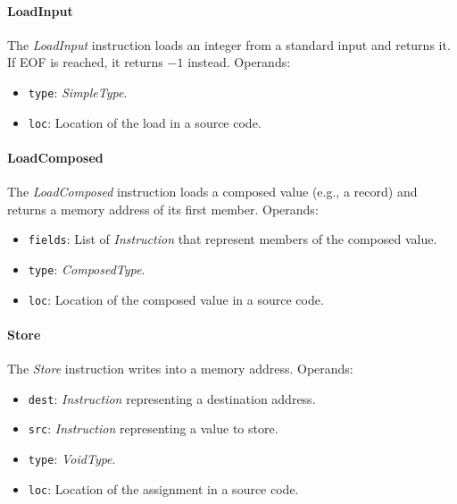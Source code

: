 \documentclass[thesis=M,english]{FITthesis}[2019/12/23]
\begin{document}
\paragraph*{LoadInput} The \emph{LoadInput} instruction loads an integer from a standard input and returns it. If EOF is reached, it returns $-1$ instead. Operands:
\begin{itemize}
    \item \texttt{type}: \emph{SimpleType}.
    \item \texttt{loc}: Location of the load in a source code.
\end{itemize}

\paragraph*{LoadComposed} The \emph{LoadComposed} instruction loads a composed value (e.g., a record) and returns a memory address of its first member. Operands:
\begin{itemize}
    \item \texttt{fields}: List of \emph{Instruction} that represent members of the composed value.
    \item \texttt{type}: \emph{ComposedType}.
    \item \texttt{loc}: Location of the composed value in a source code.
\end{itemize}

\paragraph*{Store} The \emph{Store} instruction writes into a memory address. Operands:
\begin{itemize}
    \item \texttt{dest}: \emph{Instruction} representing a destination address.
    \item \texttt{src}: \emph{Instruction} representing a value to store.
    \item \texttt{type}: \emph{VoidType}.
    \item \texttt{loc}: Location of the assignment in a source code.
\end{itemize}
\end{document}
